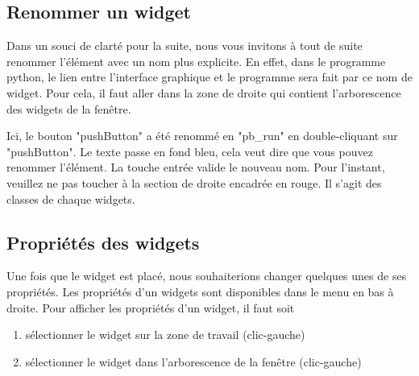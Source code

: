 
\subsection{Renommer un widget}

Dans un souci de clarté pour la suite, nous vous invitons à tout de suite renommer l'élément avec un nom plus explicite. \newline
{\color{red}En effet, dans le programme python, le lien entre l'interface graphique et le programme sera fait par ce nom de widget.} \newline 
Pour cela, il faut aller dans la zone de droite qui contient l'arborescence des widgets de la fenêtre.



Ici, le bouton "pushButton" a été renommé en "pb\_run" en double-cliquant sur "pushButton". Le texte passe en fond bleu, cela veut dire que vous pouvez renommer l'élément. La touche entrée valide le nouveau nom. \newline
Pour l'instant, veuillez ne pas toucher à la section de droite encadrée en rouge. Il s'agit des classes de chaque widgets. 



\subsection{Propriétés des widgets}

Une fois que le widget est placé, nous souhaiterions changer quelques unes de ses propriétés. \newline
Les propriétés d'un widgets sont disponibles dans le menu en bas à droite.
Pour afficher les propriétés d'un widget, il faut soit
\begin{enumerate}
    \item sélectionner le widget sur la zone de travail (clic-gauche)
    \item sélectionner le widget dans l'arborescence de la fenêtre (clic-gauche)
\end{enumerate}



